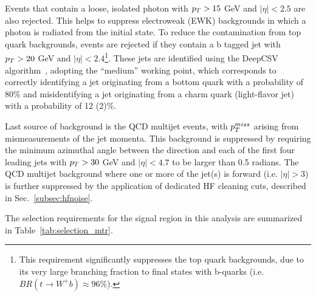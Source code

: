 Events that contain a loose, isolated photon with $p_T>15$ GeV and $|\eta| < 2.5$ are also rejected. 
This helps to suppress electroweak (EWK) backgrounds in which a photon is radiated from the initial state.
To reduce the contamination from top quark backgrounds, events are rejected if they contain a b tagged jet with $p_T > 20$ GeV 
and $|\eta| < 2.4$\footnote{This requirement significantly suppresses the top quark backgrounds, due to its very large branching fraction
to final states with b-quarks (i.e. $BR(t \rightarrow W^{+} b) \approx 96\%$).}. 
These jets are identified using the DeepCSV algorithm~\cite{CMS_NOTE_2018-323,Sirunyan:2017ezt}, 
adopting the ``medium'' working point, which corresponds to correctly identifying a jet originating from a bottom quark with 
a probability of 80\% and misidentifying a jet originating from a charm quark (light-flavor jet) with a probability of 12 (2)\%.

Last source of background is the QCD multijet events, with $p_T^{miss}$ arising from mismeasurements of the jet momenta. 
This background is suppressed by requiring the minimum
azimuthal angle between the \ptvecmiss direction and each of the first four leading jets with $p_T > 30$ GeV
and $|\eta| < 4.7$ to be larger than 0.5 radians. The QCD multijet background where one or more of the jet(s) is forward (i.e. $|\eta|>3$)
is further suppressed by the application of dedicated HF cleaning cuts, described in Sec.~\ref{subsec:hfnoise}.

The selection requirements for the signal region in this analysis are summarized in Table~\ref{tab:selection_mtr}.


